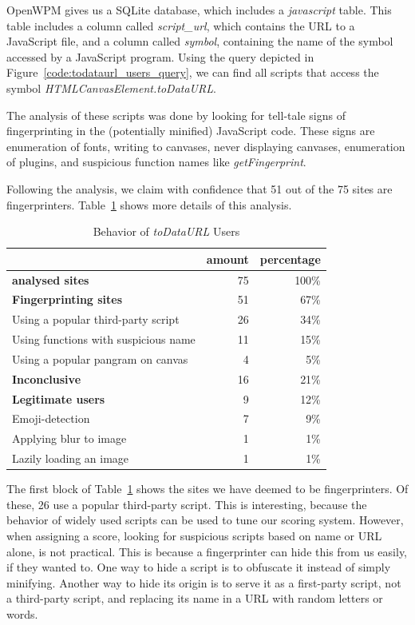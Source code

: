 \documentclass[
    fontsize=12pt,
    headings=small,
    parskip=half,
    bibliography=totoc,
    numbers=noenddot,
    open=any
    ]{scrreprt}
\begin{document}
OpenWPM gives us a SQLite database, which includes a \textit{javascript} table.
This table includes a column called \textit{script\_url}, which contains
the URL to a JavaScript file, and a column called \textit{symbol}, containing
the name of the symbol accessed by a JavaScript program.
Using the query depicted in Figure~\ref{code:todataurl_users_query}, we can find all scripts
that access the symbol \textit{HTMLCanvasElement.toDataURL}.

The analysis of these scripts was done by looking for tell-tale signs of fingerprinting
in the (potentially minified) JavaScript code.
These signs are enumeration of fonts, writing to canvases, never displaying canvases,
enumeration of plugins, and suspicious function names like \textit{getFingerprint}.

Following the analysis, we claim with confidence that 51 out of the 75 sites are fingerprinters.
Table~\ref{table:todataurl_users} shows more details of this analysis.

\begin{table}
\centering
\caption{Behavior of \textit{toDataURL} Users}
\begin{tabular}{l r r}
    \toprule
    & amount & percentage \\
    \midrule
    \textbf{analysed sites} & 75 & 100\% \\
    \midrule
    \textbf{Fingerprinting sites} & 51 & 67\% \\
    Using a popular third-party script & 26 & 34\% \\
    Using functions with suspicious name & 11 & 15\% \\
    Using a popular pangram on canvas & 4 & 5\% \\
    \midrule
    \textbf{Inconclusive} & 16 & 21\% \\
    \midrule
    \textbf{Legitimate users} & 9 & 12\% \\
    Emoji-detection & 7 & 9\% \\
    Applying blur to image & 1 & 1\% \\
    Lazily loading an image & 1 & 1\% \\
    \bottomrule
\end{tabular}
\label{table:todataurl_users}
\end{table}

The first block of Table~\ref{table:todataurl_users} shows the sites
we have deemed to be fingerprinters. Of these, 26 use a popular third-party script.
This is interesting, because the behavior of widely used scripts can be used to tune our scoring system.
However, when assigning a score, looking for suspicious scripts based on
name or URL alone, is not practical. This is because a fingerprinter
can hide this from us easily, if they wanted to.
One way to hide a script is to obfuscate it instead of simply minifying.
Another way to hide its origin is to serve it as a first-party script,
not a third-party script, and replacing its name in a URL with random
letters or words.
\end{document}
